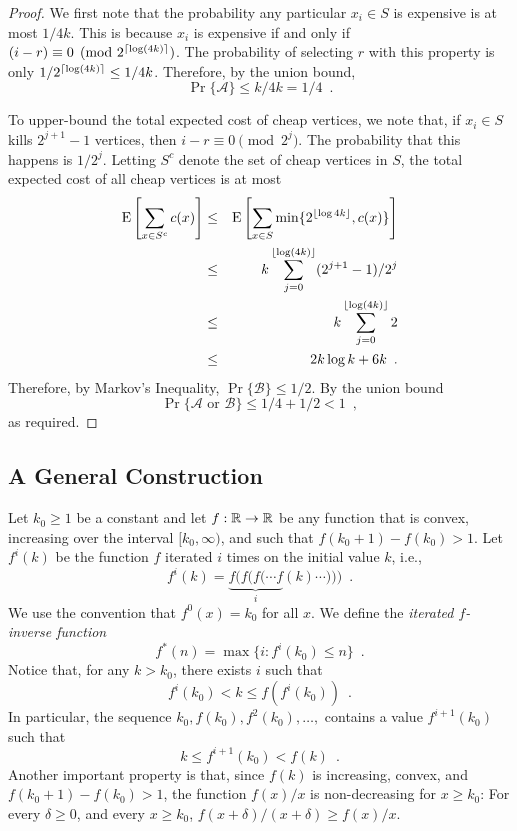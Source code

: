 \documentclass{sig-alternate}
\begin{document}
\begin{proof}
  We first note that the probability any particular $x_i\in S$ is
  expensive is at most $1/4k$.  This is because $x_i$ is expensive if and
  only if $(i-r)\equiv 0 \pmod {2^{{\lceil \log(4k) \rceil}}}$.  The probability
  of selecting $r$ with this property is only $1/2^{{\lceil \log(4k) \rceil}}
  \le 1/4k$. Therefore, by the union bound,
  \[
     \Pr\{\mathcal{A}\} \le k/4k = 1/4 \enspace .
  \]

  To upper-bound the total expected cost of cheap vertices, we note that,
  if $x_i\in S$ kills $2^{j+1}-1$ vertices, then $i-r\equiv 0\pmod{2^j}$.
  The probability that this happens is $1/2^{j}$. 
  Letting $S^{c}$
  denote the set of cheap vertices in $S$, the total expected cost of
  all cheap vertices is at most
  \begin{eqnarray*}
     \mathrm{E}\left[\sum_{x\in S^{c}}c(x) \right] 
     &\le& \mathrm{E}\left[\sum_{x\in S}\min\{2^{{\lfloor \log 4k \rfloor}},c(x)\} \right]  \\
    &\le&  k\sum_{j=0}^{{\lfloor \log (4k) \rfloor}} (2^{j+1}-1)/2^j \\
     &\le& k\sum_{j=0}^{{\lfloor \log (4k) \rfloor}} 2 \\
     &\le & 2k\log k + 6k \enspace .
  \end{eqnarray*}
  Therefore, by Markov's Inequality, $\Pr\{\mathcal{B}\}\le 1/2$.
  By the union bound
  \[
     \Pr\{\mbox{$\mathcal{A}$ or $\mathcal{B}$}\} \le 1/4+ 1/2 < 1
  \enspace ,
  \]
  as required.
\end{proof}

\subsection{A General Construction}

Let $k_0\ge 1$ be a constant and let $f:\mathbb{R}\rightarrow\mathbb{R}$ be any function
that is convex, increasing over the interval $[k_0,\infty)$, and such that
$f(k_0+1)-f(k_0) > 1$.  Let $f^{i}(k)$ be the function $f$ iterated $i$
times on the initial value $k$, i.e.,
\[
   f^{i}(k) = \underbrace{f(f(f(\cdots f}_{i}(k)\cdots))) \enspace .
\]
We use the convention that $f^0(x) = k_0$ for all $x$.  We define the
\emph{iterated $f$-inverse function}
\[
   f^*(n) = \max\{i : f^{i}(k_0) \le n\} \enspace .
\] 
Notice that, for any $k> k_0$, there exists $i$ such that
\[
   f^i(k_0) < k \le f(f^i(k_0)) \enspace .
\]
In particular, the sequence $k_0,f(k_0),f^2(k_0),\ldots,$ contains
a value $f^{i+1}(k_0)$ such that
\[
      k  \le  f^{i+1}(k_0) < f(k) \enspace .
\]
Another important property is that, since $f(k)$ is increasing, convex,
and $f(k_0+1)-f(k_0)>1$, the function $f(x)/x$ is non-decreasing
for $x\ge k_0$: For every $\delta\ge 0$, and every $x\ge k_0$,
$f(x+\delta)/(x+\delta) \ge f(x)/x$.
\end{document}
